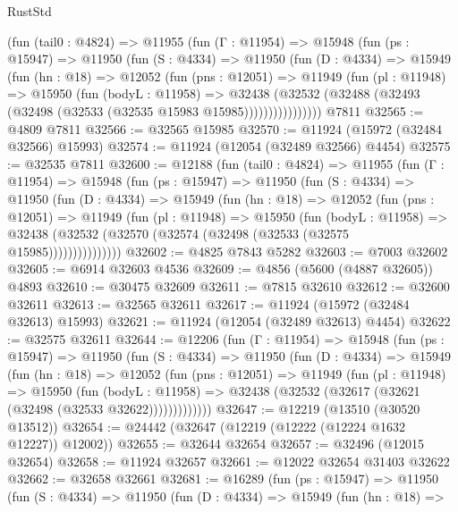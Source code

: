 \begin{lexlean}{RustStd}
\begin{coremodule}
      (fun (tail0 : @4824) =>
      @11955
        (fun (Γ : @11954) =>
        @15948
          (fun (ps : @15947) =>
          @11950
            (fun (S : @4334) =>
            @11950
              (fun (D : @4334) =>
              @15949
                (fun (hn : @18) =>
                @12052
                  (fun (pns : @12051) =>
                  @11949
                    (fun (pl : @11948) =>
                    @15950
                      (fun (bodyL : @11958) =>
                      @32438
                        (@32532
                          (@32488 (@32493 (@32498 (@32533 (@32535 @15983 @15985))))))))))))))))
    @7811
@32565 := @4809 @7811
@32566 := @32565 @15985
@32570 := @11924 (@15972 (@32484 @32566) @15993)
@32574 := @11924 (@12054 (@32489 @32566) @4454)
@32575 := @32535 @7811
@32600 := @12188
    (fun (tail0 : @4824) =>
    @11955
      (fun (Γ : @11954) =>
      @15948
        (fun (ps : @15947) =>
        @11950
          (fun (S : @4334) =>
          @11950
            (fun (D : @4334) =>
            @15949
              (fun (hn : @18) =>
              @12052
                (fun (pns : @12051) =>
                @11949
                  (fun (pl : @11948) =>
                  @15950
                    (fun (bodyL : @11958) =>
                    @32438 (@32532 (@32570 (@32574 (@32498 (@32533 (@32575 @15985)))))))))))))))
@32602 := @4825 @7843 @5282
@32603 := @7003 @32602
@32605 := @6914 @32603 @4536
@32609 := @4856 (@5600 (@4887 @32605)) @4893
@32610 := @30475 @32609
@32611 := @7815 @32610
@32612 := @32600 @32611
@32613 := @32565 @32611
@32617 := @11924 (@15972 (@32484 @32613) @15993)
@32621 := @11924 (@12054 (@32489 @32613) @4454)
@32622 := @32575 @32611
@32644 := @12206
    (fun (Γ : @11954) =>
    @15948
      (fun (ps : @15947) =>
      @11950
        (fun (S : @4334) =>
        @11950
          (fun (D : @4334) =>
          @15949
            (fun (hn : @18) =>
            @12052
              (fun (pns : @12051) =>
              @11949
                (fun (pl : @11948) =>
                @15950
                  (fun (bodyL : @11958) =>
                  @32438 (@32532 (@32617 (@32621 (@32498 (@32533 @32622)))))))))))))
@32647 := @12219 (@13510 (@30520 @13512))
@32654 := @24442 (@32647 (@12219 (@12222 (@12224 @1632 @12227)) @12002))
@32655 := @32644 @32654
@32657 := @32496 (@12015 @32654)
@32658 := @11924 @32657
@32661 := @12022 @32654 @31403 @32622
@32662 := @32658 @32661
@32681 := @16289
    (fun (ps : @15947) =>
    @11950
      (fun (S : @4334) =>
      @11950
        (fun (D : @4334) =>
        @15949
          (fun (hn : @18) =>

\end{coremodule}
\end{lexlean}
